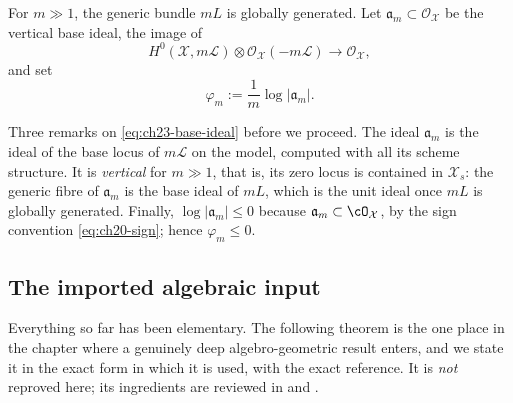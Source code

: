 For $m\gg1$, the generic bundle $mL$ is globally generated.  Let
$\mathfrak a_m\subset\mathcal O_{\mathcal X}$ be the vertical base ideal,
the image of
\begin{equation}\label{eq:ch23-base-ideal}
 H^0(\mathcal X,m\mathcal L)
       \otimes\mathcal O_{\mathcal X}(-m\mathcal L)
 \longrightarrow\mathcal O_{\mathcal X},
\end{equation}
and set
\begin{equation}\label{eq:ch23-base-potential}
                         \varphi_m
                         :=\frac1m\log|\mathfrak a_m|.
\end{equation}

Three remarks on \eqref{eq:ch23-base-ideal} before we proceed.  The ideal
$\mathfrak a_m$ is the ideal of the base locus of $m\mathcal L$ on the
model, computed with all its scheme structure.  It is \emph{vertical} for
$m\gg1$, that is, its zero locus is contained in $\mathcal X_s$: the
generic fibre of $\mathfrak a_m$ is the base ideal of $mL$, which is the
unit ideal once $mL$ is globally generated.  Finally,
$\log|\mathfrak a_m|\leq0$ because $\mathfrak a_m\subset\cO_{\mathcal X}$,
by the sign convention \eqref{eq:ch20-sign}; hence $\varphi_m\leq0$.

\subsection{The imported algebraic input}
\label{sec:ch23-imported-input}

Everything so far has been elementary.  The following theorem is the one
place in the chapter where a genuinely deep algebro-geometric result enters,
and we state it in the exact form in which it is used, with the exact
reference.  It is \emph{not} reproved here; its ingredients are reviewed in
 and
.

